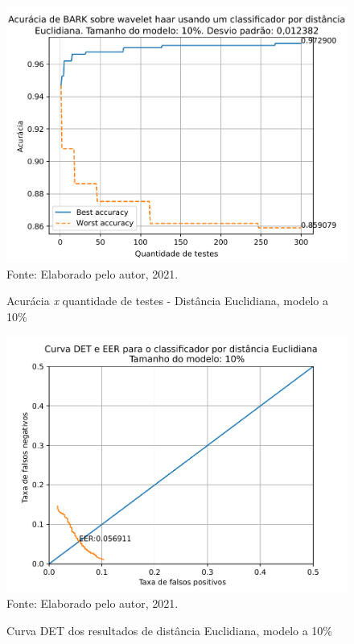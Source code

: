 			\FloatBarrier

			\begin{figure}[H]
				\centering
				\caption{Acurácia \textit{x} quantidade de testes - Distância Euclidiana, modelo a 10\%}
				\includegraphics[width=.9\linewidth]{images/results/confusionMatrices/classifier_Euclidian_10}
				\label{fig:classifiereuclidian10}
				\\Fonte: Elaborado pelo autor, 2021.
			\end{figure}

			\begin{figure}[H]
				\centering
				\caption{Curva DET dos resultados de distância Euclidiana, modelo a 10\%}
				\includegraphics[width=.9\linewidth]{images/results/det/DET_for_classifier_Euclidian_10}
				\label{fig:detforclassifiereuclidian10}
				\\Fonte: Elaborado pelo autor, 2021.
			\end{figure}
			

